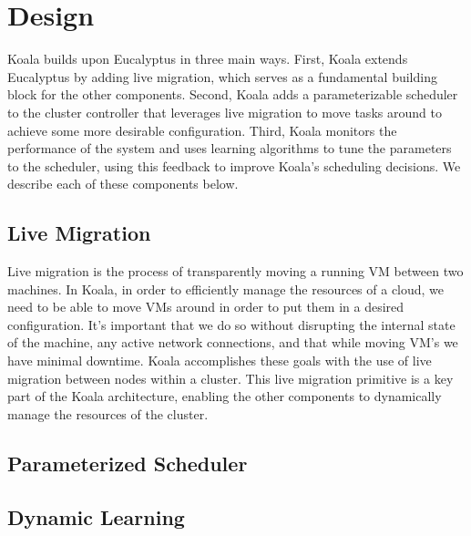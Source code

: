 \section{Design}

Koala builds upon Eucalyptus in three main ways.  First, Koala extends
Eucalyptus by adding live migration, which serves as a fundamental building
block for the other components.  Second, Koala adds a parameterizable scheduler
to the cluster controller that leverages live migration to move tasks around to
achieve some more desirable configuration.  Third, Koala monitors the
performance of the system and uses learning algorithms to tune the parameters to
the scheduler, using this feedback to improve Koala's scheduling decisions.  We
describe each of these components below.

\subsection{Live Migration}
Live migration is the process of transparently moving a running VM between two machines.  In Koala, in order to efficiently manage the resources of a cloud, we need to be able to move VMs around in order to put them in a desired configuration.  It's important that we do so without disrupting the internal state of the machine, any active network connections, and that while moving VM's we have minimal downtime.  Koala accomplishes these goals with the use of live migration between nodes within a cluster.  This live migration primitive is a key part of the Koala architecture, enabling the other components to dynamically manage the resources of the cluster.

\subsection{Parameterized Scheduler}

\subsection{Dynamic Learning}



